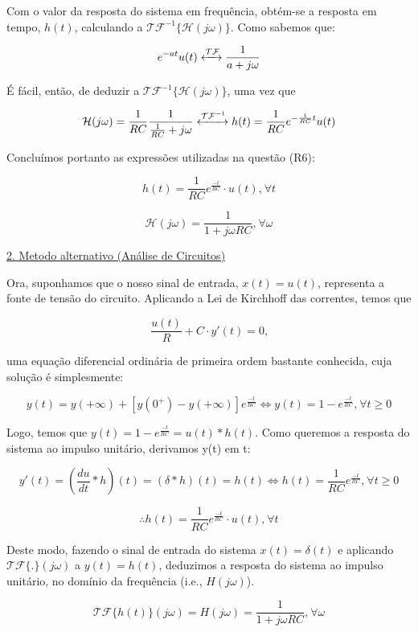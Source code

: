 Com o valor da resposta do sistema em frequência, obtém-se a resposta em tempo, \(h(t)\), calculando a \(\mathcal{TF}^{-1}\{\mathcal{H}(j\omega)\}\). Como sabemos que:

\[ e^{-at}u(t)\xleftrightarrow[]{\mathcal{TF}} \frac{1}{a+j\omega} \]

É fácil, então, de deduzir a  \(\mathcal{TF}^{-1}\{\mathcal{H}(j\omega)\}\), uma vez que

\[ \mathcal{H}(j\omega) = \frac{1}{RC} \frac{1}{\frac{1}{RC}+j\omega} \xleftrightarrow[]{\mathcal{TF}^{-1}} h(t)= \frac{1}{RC}e^{-\frac{1}{RC}t}u(t) \]

Concluímos portanto as expressões utilizadas na questão (R6):

\[ h(t) = \frac{1}{RC}e^{\frac{-t}{RC}} \cdot u(t)\text{,}\ \forall t \]

\[ \mathcal{H}(j\omega) = \frac{1}{1 + j\omega RC}\text{,}\ \forall \omega \]

\begin{normalsize}
    \begin{flushleft}
        \underline{2. Metodo alternativo (Análise de Circuitos)} 
    \end{flushleft}
\end{normalsize}

Ora, suponhamos que o nosso sinal de entrada, \(x(t) = u(t)\), representa a fonte de tensão do circuito. Aplicando a Lei de Kirchhoff das correntes, temos que 

\[ \frac{u(t)}{R} + C \cdot y'(t) = 0\text{,} \]

uma equação diferencial ordinária de primeira ordem bastante conhecida, cuja solução é simplesmente:

\[ y(t) = y(+\infty) + [y(0^+) - y(+\infty)]e^{\frac{-t}{RC}} \iff y(t) = 1 - e^{\frac{-t}{RC}}\text{,}\ \forall t \geq 0 \]

Logo, temos que \(y(t) = 1 - e^{\frac{-t}{RC}} = u(t) * h(t)\). Como queremos a resposta do sistema ao impulso unitário, derivamos y(t) em t:

\[  y'(t) = (\frac{du}{dt} * h)(t) = (\delta * h)(t) = h(t) \iff h(t) = \frac{1}{RC}e^{\frac{-t}{RC}} \text{,}\ \forall t \geq 0 \]

\[ \therefore h(t) = \frac{1}{RC}e^{\frac{-t}{RC}} \cdot u(t)\text{,}\ \forall t \]

Deste modo, fazendo o sinal de entrada do sistema \(x(t) = \delta(t)\) e aplicando \(\mathcal{TF}\{.\}(j\omega)\) a \(y(t) = h(t)\), deduzimos a resposta do sistema ao impulso unitário, no domínio da frequência (i.e., \(H(j\omega)\)).

\[ \mathcal{TF}\{h(t)\}(j\omega) = H(j\omega) = \frac{1}{1 + j\omega RC}\text{,}\ \forall \omega \]

